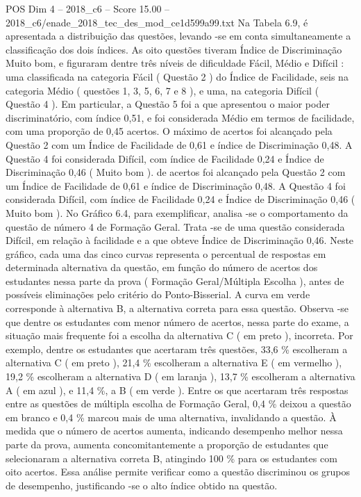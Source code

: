\begin{textsample}{POS Dim 4 – 2018\_c6 – Score 15.00 – 2018\_c6/enade\_2018\_tec\_des\_mod\_ce1d599a99.txt}
Na Tabela 6.9, é apresentada a distribuição das questões, levando -se em conta simultaneamente a classificação dos dois índices.
As oito questões tiveram Índice de Discriminação Muito bom, e figuraram dentre três níveis de dificuldade Fácil, Médio e Difícil : uma classificada na categoria Fácil ( Questão 2 ) do Índice de Facilidade, seis na categoria Médio ( questões 1, 3, 5, 6, 7 e 8 ), e uma, na categoria Difícil ( Questão 4 ).
Em particular, a Questão 5 foi a que apresentou o maior poder discriminatório, com índice 0,51, e foi considerada Médio em termos de facilidade, com uma proporção de 0,45 acertos.
O máximo de acertos foi alcançado pela Questão 2 com um Índice de Facilidade de 0,61 e índice de Discriminação 0,48.
A Questão 4 foi considerada Difícil, com índice de Facilidade 0,24 e Índice de Discriminação 0,46 ( Muito bom ). de acertos foi alcançado pela Questão 2 com um Índice de Facilidade de 0,61 e índice de Discriminação 0,48.
A Questão 4 foi considerada Difícil, com índice de Facilidade 0,24 e Índice de Discriminação 0,46 ( Muito bom ).
No Gráfico 6.4, para exemplificar, analisa -se o comportamento da questão de número 4 de Formação Geral.
Trata -se de uma questão considerada Difícil, em relação à facilidade e a que obteve Índice de Discriminação 0,46.
Neste gráfico, cada uma das cinco curvas representa o percentual de respostas em determinada alternativa da questão, em função do número de acertos dos estudantes nessa parte da prova ( Formação Geral/Múltipla Escolha ), antes de possíveis eliminações pelo critério do Ponto-Bisserial.
A curva em verde corresponde à alternativa B, a alternativa correta para essa questão.
Observa -se que dentre os estudantes com menor número de acertos, nessa parte do exame, a situação mais frequente foi a escolha da alternativa C ( em preto ), incorreta.
Por exemplo, dentre os estudantes que acertaram três questões, 33,6 \% escolheram a alternativa C ( em preto ), 21,4 \% escolheram a alternativa E ( em vermelho ), 19,2 \% escolheram a alternativa D ( em laranja ), 13,7 \% escolheram a alternativa A ( em azul ), e 11,4 \%, a B ( em verde ).
Entre os que acertaram três respostas entre as questões de múltipla escolha de Formação Geral, 0,4 \% deixou a questão em branco e 0,4 \% marcou mais de uma alternativa, invalidando a questão.
À medida que o número de acertos aumenta, indicando desempenho melhor nessa parte da prova, aumenta concomitantemente a proporção de estudantes que selecionaram a alternativa correta B, atingindo 100 \% para os estudantes com oito acertos.
Essa análise permite verificar como a questão discriminou os grupos de desempenho, justificando -se o alto índice obtido na questão.

\end{textsample}
